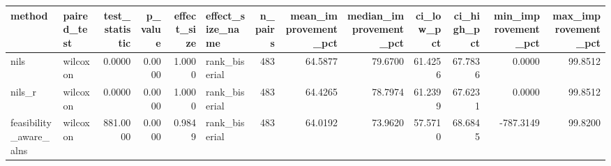 \begin{tabular}{llrrrlrrrrrrr}
\toprule
method & paired_test & test_statistic & p_value & effect_size & effect_size_name & n_pairs & mean_improvement_pct & median_improvement_pct & ci_low_pct & ci_high_pct & min_improvement_pct & max_improvement_pct \\
\midrule
nils & wilcoxon & 0.0000 & 0.0000 & 1.0000 & rank_biserial & 483 & 64.5877 & 79.6700 & 61.4256 & 67.7836 & 0.0000 & 99.8512 \\
nils_r & wilcoxon & 0.0000 & 0.0000 & 1.0000 & rank_biserial & 483 & 64.4265 & 78.7974 & 61.2399 & 67.6231 & 0.0000 & 99.8512 \\
feasibility_aware_alns & wilcoxon & 881.0000 & 0.0000 & 0.9849 & rank_biserial & 483 & 64.0192 & 73.9620 & 57.5710 & 68.6845 & -787.3149 & 99.8200 \\
\bottomrule
\end{tabular}
